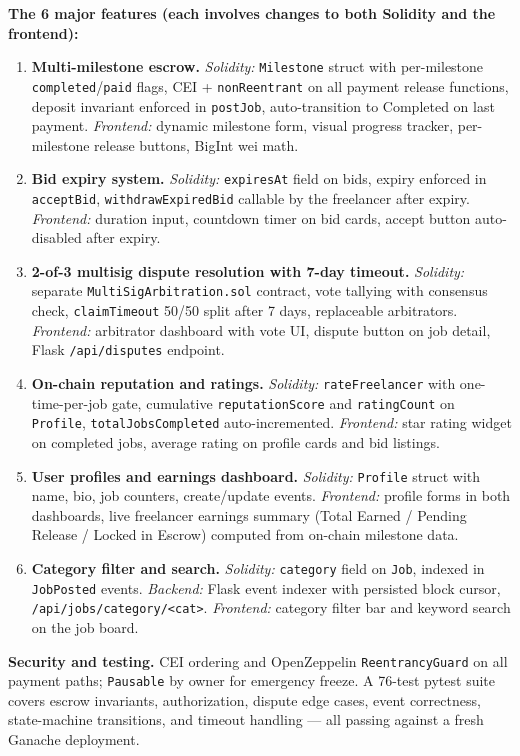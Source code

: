 \documentclass[11pt]{article}
\begin{document}
\textbf{The 6 major features (each involves changes to both Solidity and the frontend):}
\begin{enumerate}
    \item \textbf{Multi-milestone escrow.} \emph{Solidity:} \texttt{Milestone} struct with per-milestone \texttt{completed}/\texttt{paid} flags, CEI + \texttt{nonReentrant} on all payment release functions, deposit invariant enforced in \texttt{postJob}, auto-transition to Completed on last payment. \emph{Frontend:} dynamic milestone form, visual progress tracker, per-milestone release buttons, BigInt wei math.
    \item \textbf{Bid expiry system.} \emph{Solidity:} \texttt{expiresAt} field on bids, expiry enforced in \texttt{acceptBid}, \texttt{withdrawExpiredBid} callable by the freelancer after expiry. \emph{Frontend:} duration input, countdown timer on bid cards, accept button auto-disabled after expiry.
    \item \textbf{2-of-3 multisig dispute resolution with 7-day timeout.} \emph{Solidity:} separate \texttt{MultiSigArbitration.sol} contract, vote tallying with consensus check, \texttt{claimTimeout} 50/50 split after 7 days, replaceable arbitrators. \emph{Frontend:} arbitrator dashboard with vote UI, dispute button on job detail, Flask \texttt{/api/disputes} endpoint.
    \item \textbf{On-chain reputation and ratings.} \emph{Solidity:} \texttt{rateFreelancer} with one-time-per-job gate, cumulative \texttt{reputationScore} and \texttt{ratingCount} on \texttt{Profile}, \texttt{totalJobsCompleted} auto-incremented. \emph{Frontend:} star rating widget on completed jobs, average rating on profile cards and bid listings.
    \item \textbf{User profiles and earnings dashboard.} \emph{Solidity:} \texttt{Profile} struct with name, bio, job counters, create/update events. \emph{Frontend:} profile forms in both dashboards, live freelancer earnings summary (Total Earned / Pending Release / Locked in Escrow) computed from on-chain milestone data.
    \item \textbf{Category filter and search.} \emph{Solidity:} \texttt{category} field on \texttt{Job}, indexed in \texttt{JobPosted} events. \emph{Backend:} Flask event indexer with persisted block cursor, \texttt{/api/jobs/category/<cat>}. \emph{Frontend:} category filter bar and keyword search on the job board.
\end{enumerate}

\textbf{Security and testing.}
CEI ordering and OpenZeppelin \texttt{ReentrancyGuard} on all payment paths; \texttt{Pausable} by owner for emergency freeze. A 76-test pytest suite covers escrow invariants, authorization, dispute edge cases, event correctness, state-machine transitions, and timeout handling --- all passing against a fresh Ganache deployment.
\end{document}
